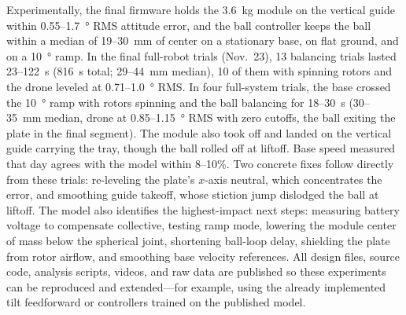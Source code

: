 Experimentally, the final firmware holds the \SI{3.6}{\kilo\gram} module on the vertical guide within 0.55--\SI{1.7}{\degree} RMS attitude error, and the ball controller keeps the ball within a median of 19--\SI{30}{\milli\metre} of center on a stationary base, on flat ground, and on a \SI{10}{\degree} ramp. In the final full-robot trials (Nov.~23), 13 balancing trials lasted 23--\SI{122}{\second} (\SI{816}{\second} total; 29--\SI{44}{\milli\metre} median), 10 of them with spinning rotors and the drone leveled at 0.71--\SI{1.0}{\degree} RMS. In four full-system trials, the base crossed the \SI{10}{\degree} ramp with rotors spinning and the ball balancing for 18--\SI{30}{\second} (30--\SI{35}{\milli\metre} median, drone at 0.85--\SI{1.15}{\degree} RMS with zero cutoffs, the ball exiting the plate in the final segment). The module also took off and landed on the vertical guide carrying the tray, though the ball rolled off at liftoff. Base speed measured that day agrees with the model within 8--10\%. Two concrete fixes follow directly from these trials: re-leveling the plate's $x$-axis neutral, which concentrates the error, and smoothing guide takeoff, whose stiction jump dislodged the ball at liftoff. The model also identifies the highest-impact next steps: measuring battery voltage to compensate collective, testing ramp mode, lowering the module center of mass below the spherical joint, shortening ball-loop delay, shielding the plate from rotor airflow, and smoothing base velocity references. All design files, source code, analysis scripts, videos, and raw data are published so these experiments can be reproduced and extended---for example, using the already implemented tilt feedforward or controllers trained on the published model.
